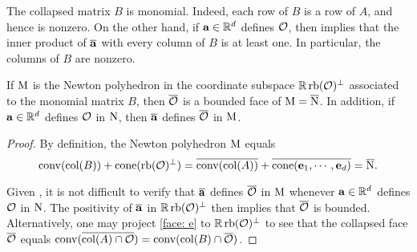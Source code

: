 \documentclass[11pt]{amsart}
\begin{document}
\begin{remark}
\label{collapse of monomial is monomial: R}
The collapsed matrix $B$ is monomial.  Indeed, each row of $B$ is a row of $A$, and hence is nonzero.   On the other hand, if $\mathbf{a} \in \mathbb{R}^d$ defines $\mathcal{O}$, then  implies that the inner product of $\overline{\mathbf{a}}$ with every column of $B$ is at least one.  In particular, the columns of $B$ are nonzero.
\end{remark}


%


\begin{lemma}
\label{collapse of Newton polyhedron: L} 
If $\mathrm{M}$ is the Newton polyhedron in the coordinate subspace $\mathbb{R} \operatorname{rb}(\mathcal{O})^{\perp}$ associated to the monomial matrix $B$, then $\overline{\mathcal{O}}$ is a bounded face of $\mathrm{M} = \overline{\mathrm{N}}$.    In addition, if $\mathbf{a} \in \mathbb{R}^d$ defines $\mathcal{O}$ in $\mathrm{N}$, then $ \overline{\mathbf{a}}$ defines $\overline{\mathcal{O}}$ in $\mathrm{M}$. 
\end{lemma}

\begin{proof}
By definition, the Newton polyhedron $\mathrm{M}$ equals
%
\[  \operatorname{conv}( \operatorname{col}(B) ) + \operatorname{cone}(\operatorname{rb}(\mathcal{O})^{\perp}) =  \overline{\operatorname{conv}( \operatorname{col}(A))} + \overline{\operatorname{cone}(\mathbf{e}_1, \cdots, \mathbf{e}_d)} =  \overline{\mathrm{N}}.\]

Given , it is not difficult to verify that $\overline{\mathbf{a}}$ defines $\overline{\mathcal{O}}$ in $\mathrm{M}$ whenever $\mathbf{a} \in \mathbb{R}^d$ defines $\mathcal{O}$ in $\mathrm{N}$.  The positivity of $\overline{\mathbf{a}}$ in $\mathbb{R} \operatorname{rb}(\mathcal{O})^{\perp}$ then implies that $\overline{\mathcal{O}}$ is bounded.  Alternatively, one may project \eqref{face: e} to $\mathbb{R} \operatorname{rb}(\mathcal{O})^{\perp}$ to see that the collapsed face $\overline{\mathcal{O}}$ equals $\operatorname{conv}( \overline{ \operatorname{col}(A) \cap \mathcal{O}}) = \operatorname{conv}( \operatorname{col}(B) \cap \overline{\mathcal{O}})$.  
\end{proof}
\end{document}
